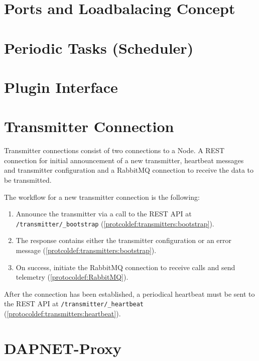\section{Ports and Loadbalacing Concept}

\section{Periodic Tasks (Scheduler)}

\section{Plugin Interface}

\section{Transmitter Connection}
Transmitter connections consist of two connections to a Node. A REST connection
for initial announcement of a new transmitter, heartbeat messages and
transmitter configuration and a RabbitMQ connection to receive the data to be
transmitted.

The workflow for a new transmitter connection is the following:
\begin{enumerate}
\item Announce the transmitter via a call to the REST API at \texttt{/transmitter/\_bootstrap} (\ref{protcoldef:transmitters:bootstrap}).
\item The response contains either the transmitter configuration or an error message (\ref{protcoldef:transmitters:bootstrap}).
\item On success, initiate the RabbitMQ connection to receive calls and send telemetry (\ref{protocoldef:RabbitMQ}).
\end{enumerate}

After the connection has been established, a periodical heartbeat must be sent
to the REST API at \texttt{/transmitter/\_heartbeat}
(\ref{protocoldef:transmitters:heartbeat}).

\section{DAPNET-Proxy}